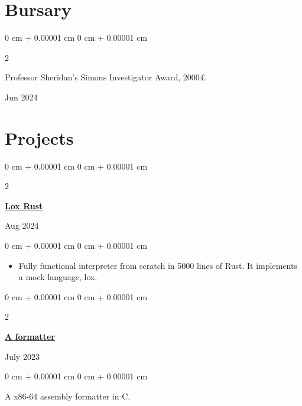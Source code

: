 \documentclass[10pt, a4paper]{article}
\newenvironment{highlights}{
    \begin{itemize}[
        topsep=0.10 cm,
        parsep=0.10 cm,
        partopsep=0pt,
        itemsep=0pt,
        leftmargin=0 cm + 10pt
    ]
}{
    \end{itemize}
} %
\newenvironment{onecolentry}{
    \begin{adjustwidth}{
        0 cm + 0.00001 cm
    }{
        0 cm + 0.00001 cm
    }
}{
    \end{adjustwidth}
} %
\newenvironment{twocolentry}[2][]{
    \onecolentry
    \def\secondColumn{#2}
    \setcolumnwidth{\fill, 4.5 cm}
    \begin{paracol}{2}
}{
    \switchcolumn \raggedleft \secondColumn
    \end{paracol}
    \endonecolentry
} %
\begin{document}
    \section{Bursary}
        
        \begin{samepage}
            \begin{twocolentry}{
                Jun 2024
            }
                Professor Sheridan's Simons Investigator Award, 2000£
            \end{twocolentry}

        \end{samepage}


    
    \section{Projects}

        \begin{twocolentry}{
            Aug 2024
		}
		\href{https://github.com/harryhanYuhao/lox-rust.git}{\underline{\textbf{Lox Rust}}}
		\end{twocolentry}
        \vspace{0.10 cm}
        \begin{onecolentry}
            \begin{highlights}
                \item Fully functional interpreter from scratch in 5000 lines of Rust.
				It implements a mock language, lox.
            \end{highlights}
        \end{onecolentry}

        \vspace{0.15 cm}

        \begin{twocolentry}{
				July 2023
        }
		\href{https://github.com/harryhanYuhao/aformatter}{\underline{\textbf{A formatter}}}
		\end{twocolentry}
        \vspace{0.10 cm}
        \begin{onecolentry}
			A x86-64 assembly formatter in C.
        \end{onecolentry}
\end{document}

